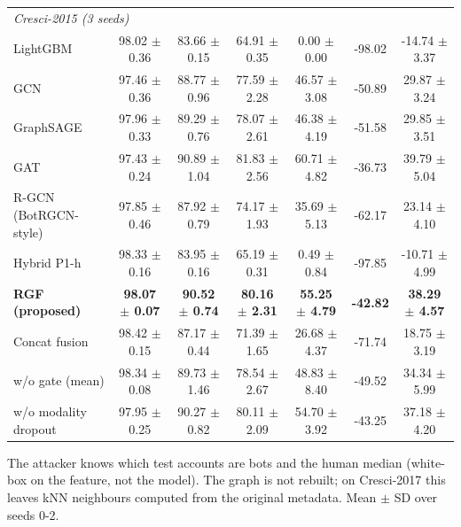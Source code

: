 \begin{table}[!t]
\begin{tabular}{lcccccc}
\multicolumn{7}{l}{\textit{Cresci-2015 (3 seeds)}} \\
LightGBM & 98.02 $\pm$ 0.36 & 83.66 $\pm$ 0.15 & 64.91 $\pm$ 0.35 & 0.00 $\pm$ 0.00 & -98.02 & -14.74 $\pm$ 3.37 \\
GCN & 97.46 $\pm$ 0.36 & 88.77 $\pm$ 0.96 & 77.59 $\pm$ 2.28 & 46.57 $\pm$ 3.08 & -50.89 & 29.87 $\pm$ 3.24 \\
GraphSAGE & 97.96 $\pm$ 0.33 & 89.29 $\pm$ 0.76 & 78.07 $\pm$ 2.61 & 46.38 $\pm$ 4.19 & -51.58 & 29.85 $\pm$ 3.51 \\
GAT & 97.43 $\pm$ 0.24 & 90.89 $\pm$ 1.04 & 81.83 $\pm$ 2.56 & 60.71 $\pm$ 4.82 & -36.73 & 39.79 $\pm$ 5.04 \\
R-GCN (BotRGCN-style) & 97.85 $\pm$ 0.46 & 87.92 $\pm$ 0.79 & 74.17 $\pm$ 1.93 & 35.69 $\pm$ 5.13 & -62.17 & 23.14 $\pm$ 4.10 \\
Hybrid P1-h & 98.33 $\pm$ 0.16 & 83.95 $\pm$ 0.16 & 65.19 $\pm$ 0.31 & 0.49 $\pm$ 0.84 & -97.85 & -10.71 $\pm$ 4.99 \\
\textbf{RGF (proposed)} & \textbf{98.07 $\pm$ 0.07} & \textbf{90.52 $\pm$ 0.74} & \textbf{80.16 $\pm$ 2.31} & \textbf{55.25 $\pm$ 4.79} & \textbf{-42.82} & \textbf{38.29 $\pm$ 4.57} \\
Concat fusion & 98.42 $\pm$ 0.15 & 87.17 $\pm$ 0.44 & 71.39 $\pm$ 1.65 & 26.68 $\pm$ 4.37 & -71.74 & 18.75 $\pm$ 3.19 \\
w/o gate (mean) & 98.34 $\pm$ 0.08 & 89.73 $\pm$ 1.46 & 78.54 $\pm$ 2.67 & 48.83 $\pm$ 8.40 & -49.52 & 34.34 $\pm$ 5.99 \\
w/o modality dropout & 97.95 $\pm$ 0.25 & 90.27 $\pm$ 0.82 & 80.11 $\pm$ 2.09 & 54.70 $\pm$ 3.92 & -43.25 & 37.18 $\pm$ 4.20 \\
\hline
\end{tabular}
\par\smallskip\parbox{\linewidth}{\scriptsize The attacker knows which test accounts are bots and the human median (white-box on the feature, not the model). The graph is not rebuilt; on Cresci-2017 this leaves kNN neighbours computed from the original metadata. Mean $\pm$ SD over seeds 0-2.}
\end{table}


